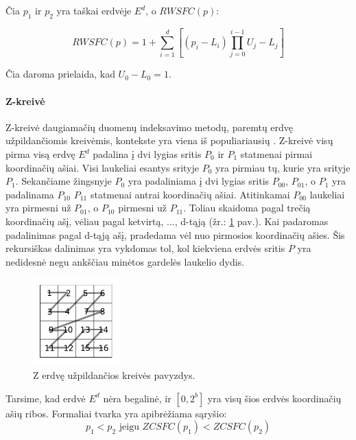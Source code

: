 Čia $p_1$ ir $p_2$ yra taškai erdvėje $E^d$, o $RWSFC(p)$:

\begin{equation}
	RWSFC(p) = 1 + \sum_{i=1}^{d} [(p_i - L_i) \prod_{j=0}^{i - 1}U_j - L_j]
\label{eq:RowWiseSFCValue}
\end{equation}

Čia daroma prielaida, kad $U_0 - L_0 = 1$.



\paragraph{Z-kreivė}

Z-kreivė daugiamačių duomenų indeksavimo metodų, paremtų erdvę užpildančiomis kreivėmis, kontekste yra viena iš populiariausių \cite{ramsak2000integrating}.
Z-kreivė visų pirma visą erdvę $E^d$ padalina į dvi lygias sritis $P_0$ ir $P_1$ statmenai pirmai koordinačių ašiai.
Visi laukeliai esantys srityje $P_0$ yra pirmiau tų, kurie yra srityje $P_1$.
Sekančiame žingsnyje $P_0$ yra padaliniama į dvi lygias sritis $P_{00}$, $P_{01}$, o $P_1$ yra padalinama $P_{10}$ $P_{11}$ statmenai antrai koordinačių ašiai.
Atitinkamai $P_{00}$ laukeliai yra pirmesni už $P_{01}$, o $P_{10}$ pirmesni už $P_{11}$.
Toliau skaidoma pagal trečią koordinačių ašį, vėliau pagal ketvirtą, ..., d-tąją (žr.: \ref{img:ZCurveSpaceFillingCurve} pav.).
Kai padaromas padalinimas pagal d-tąją ašį, pradedama vėl nuo pirmosios koordinačių ašies.
Šis rekursiškas dalinimas yra vykdomas tol, kol kiekviena erdvės sritis $P$ yra nedidesnė negu ankščiau minėtos gardelės laukelio dydis.

\begin{figure}[H]
\begin{center}
\includegraphics[width=0.3\textwidth]{img/ZCurveSpaceFillingCurve.png}
\caption{Z erdvę užpildančios kreivės pavyzdys.}
\label{img:ZCurveSpaceFillingCurve}
\end{center}
\end{figure}

Tarsime, kad erdvė $E^d$ nėra begalinė, ir $[0, 2^b]$ yra visų šios erdvės koordinačių ašių ribos.
Formaliai tvarka yra apibrėžiama sąryšio:
\begin{equation}
	p_1 < p_2 \text{ jeigu } ZCSFC(p_1) < ZCSFC(p_2)
\label{eq:ZCurveSFCComparison}
\end{equation}

